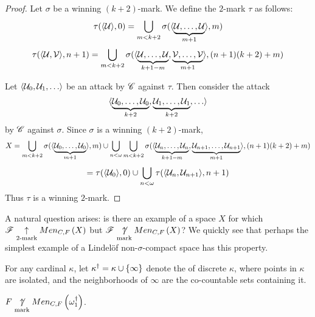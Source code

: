 \begin{proof}
  Let $\sigma$ be a winning $(k+2)$-mark. We define the $2$-mark $\tau$ as
  follows:
    \[
      \tau(\langle\mathcal{U}\rangle,0)
        =
      \bigcup_{m<k+2}
        \sigma(\langle\underbrace{\mathcal{U},\dots,\mathcal{U}}_{m+1}\rangle,m)
    \]
    \[
      \tau(\langle\mathcal{U},\mathcal{V}\rangle,n+1)
        =
      \bigcup_{m<k+2}
        \sigma(\langle
          \underbrace{\mathcal{U},\dots,\mathcal{U}}_{k+1-m},
          \underbrace{\mathcal{V},\dots,\mathcal{V}}_{m+1}
        \rangle,(n+1)(k+2)+m)
    \]

  Let $\<\mc U_0,\mc U_1,\dots\>$ be an attack by $\mathscr{C}$ against $\tau$.
  Then consider the attack
    \[
      \<
        \underbrace{\mc U_0,\dots,\mc U_0}_{k+2},
        \underbrace{\mc U_1,\dots,\mc U_1}_{k+2},
        \dots
      \>
    \]
  by $\mathscr{C}$ against $\sigma$. Since $\sigma$ is a winning $(k+2)$-mark,
    \[
      X
        =
      \bigcup_{m<k+2}
        \sigma(\langle\underbrace{\mathcal{U}_0,\dots,\mathcal{U}_0}_{m+1}\rangle,m)
      \cup
      \bigcup_{n<\omega}
      \bigcup_{m<k+2}
        \sigma(\langle
          \underbrace{\mathcal{U}_n,\dots,\mathcal{U}_n}_{k+1-m},
          \underbrace{\mathcal{U}_{n+1},\dots,\mathcal{U}_{n+1}}_{m+1}
        \rangle,(n+1)(k+2)+m)
    \]
    \[
      =
      \tau(\langle\mathcal{U}_0\rangle,0)
      \cup
      \bigcup_{n<\omega}
      \tau(\langle\mathcal{U}_n,\mathcal{U}_{n+1}\rangle,n+1)
    \]
  Thus $\tau$ is a winning $2$-mark.
\end{proof}

A natural question arises: is there an example of a space $X$ for which
$\mathscr{F}\underset{2\text{-mark}}{\uparrow}Men_{C,F}\left({X}\right)$ but $\mathscr{F}\underset{\text{mark}}{\not\uparrow}Men_{C,F}\left({X}\right)$? We quickly
see that perhaps the simplest example of a Lindel\"of non-$\sigma$-compact
space has this property.

\begin{defn}
  For any cardinal $\kappa$, let $\kappa^\dagger=\kappa\cup\{\infty\}$ denote
  the  of discrete $\kappa$, where points in
  $\kappa$ are isolated, and the neighborhoods of $\infty$ are the co-countable
  sets containing it.
\end{defn}

\begin{thm}
  $F\underset{\text{mark}}{\not\uparrow}Men_{C,F}\left({\omega_1^\dagger}\right)$.
\end{thm}

